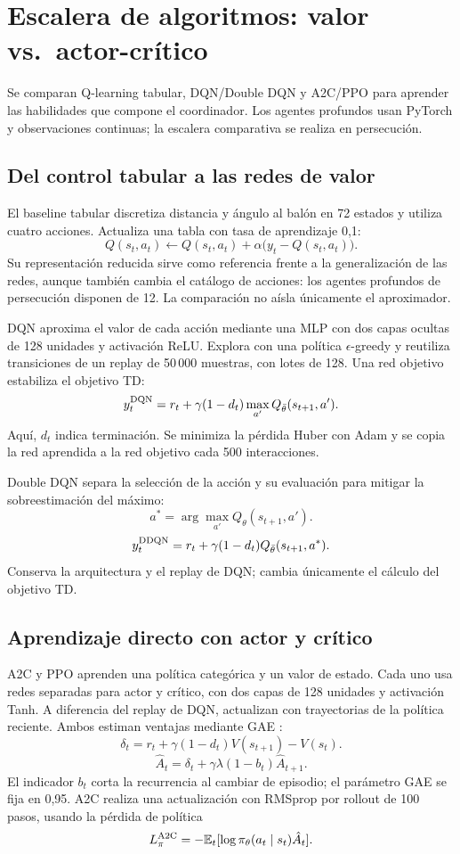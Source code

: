 \section{Escalera de algoritmos: valor vs.\ actor-crítico}
Se comparan Q-learning tabular, DQN/Double DQN y A2C/PPO para aprender las
habilidades que compone el coordinador. Los agentes profundos usan PyTorch y
observaciones continuas; la escalera comparativa se realiza en persecución.

\subsection{Del control tabular a las redes de valor}
El baseline tabular discretiza distancia y ángulo al balón en 72 estados y utiliza
cuatro acciones. Actualiza una tabla con tasa de aprendizaje 0,1:
\[
    Q(s_t,a_t)\leftarrow Q(s_t,a_t)+\alpha\bigl(y_t-Q(s_t,a_t)\bigr).
\]
Su representación reducida sirve como referencia frente a la generalización de
las redes, aunque también cambia el catálogo de acciones: los agentes profundos
de persecución disponen de 12. La comparación no aísla únicamente el aproximador.

DQN \cite{mnih2015} aproxima el valor de cada acción mediante una MLP con dos capas
ocultas de 128 unidades y activación ReLU. Explora con una política
$\epsilon$-greedy y reutiliza transiciones de un replay de 50\,000 muestras,
con lotes de 128. Una red objetivo estabiliza el objetivo TD:
\[
    y_t^{\rm DQN}=r_t+\gamma(1-d_t)\max_{a'}Q_{\bar\theta}(s_{t+1},a').
\]
Aquí, $d_t$ indica terminación. Se minimiza la pérdida Huber con Adam y se copia
la red aprendida a la red objetivo cada 500 interacciones.

Double DQN \cite{vanhasselt2016} separa la selección de la acción y su evaluación
para mitigar la sobreestimación del máximo:
\[
    a^*=\arg\max_{a'}Q_\theta(s_{t+1},a').
\]
\[
    y_t^{\rm DDQN}=r_t+\gamma(1-d_t)Q_{\bar\theta}(s_{t+1},a^*).
\]
Conserva la arquitectura y el replay de DQN; cambia únicamente el cálculo del
objetivo TD.

\subsection{Aprendizaje directo con actor y crítico}
A2C y PPO aprenden una política categórica y un valor de estado. Cada uno usa
redes separadas para actor y crítico, con dos capas de 128 unidades y activación
Tanh. A diferencia del replay de DQN, actualizan con trayectorias de la política
reciente. Ambos estiman ventajas mediante GAE \cite{schulman2016gae}:
\[
    \delta_t=r_t+\gamma(1-d_t)V(s_{t+1})-V(s_t).
\]
\[
    \hat A_t=\delta_t+\gamma\lambda(1-b_t)\hat A_{t+1}.
\]
El indicador $b_t$ corta la recurrencia al cambiar de episodio; el parámetro GAE
se fija en 0,95. A2C \cite{mnih2016} realiza una actualización con RMSprop por
rollout de 100 pasos, usando la pérdida de política
\[
    L_\pi^{\rm A2C}=-\mathbb{E}_t[\log\pi_\theta(a_t\mid s_t)\hat A_t].
\]

